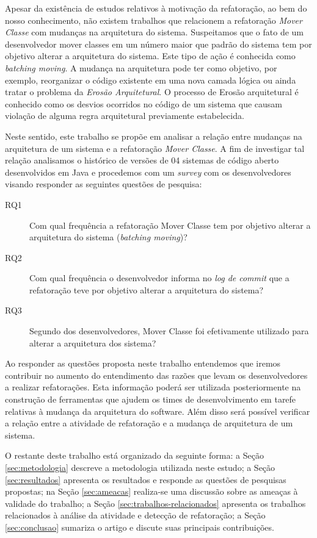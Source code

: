 \documentclass[12pt]{article}
\begin{document}
Apesar da existência de estudos relativos à motivação da refatoração, ao bem do nosso conhecimento, não existem trabalhos que relacionem a refatoração \textit{Mover Classe} com mudanças na arquitetura do sistema. Suspeitamos que o fato de um desenvolvedor mover classes em um número maior que padrão do sistema tem por objetivo alterar a arquitetura do sistema. Este tipo de ação é conhecida como \textit{batching moving}. A mudança na arquitetura pode ter como objetivo, por exemplo, reorganizar o código existente em uma nova camada lógica ou ainda tratar o problema da  \textit{Erosão Arquitetural}. O processo de Erosão arquitetural é conhecido como os desvios ocorridos no código de um sistema que causam violação de alguma regra arquitetural previamente estabelecida\cite{Perry:1992:FSS:141874.141884}.

Neste sentido, este trabalho se propõe em analisar a relação entre mudanças na arquitetura de um sistema e a refatoração \textit{Mover Classe}. A fim de investigar tal relação analisamos o histórico de versões de 04 sistemas de código aberto  desenvolvidos em Java e procedemos com um \textit{survey} com os desenvolvedores visando responder as seguintes questões de pesquisa:

\begin{description}
	\item[RQ1] Com qual frequência a refatoração Mover Classe tem por objetivo alterar a arquitetura do sistema (\textit{batching moving})?
	\item[RQ2] Com qual frequência o desenvolvedor informa no \textit{log de commit} que a refatoração teve por objetivo alterar a arquitetura do sistema?
	\item[RQ3] Segundo dos desenvolvedores, Mover Classe foi efetivamente utilizado para alterar a arquitetura dos sistema?	
\end{description}

Ao responder as questões proposta neste trabalho entendemos que iremos contribuir no aumento do entendimento das razões que levam os desenvolvedores a realizar refatorações. Esta informação poderá ser utilizada posteriormente na construção de ferramentas que ajudem os times de desenvolvimento em tarefe relativas à mudança da arquitetura do software. Além disso será possível verificar a relação entre a atividade de refatoração e a mudança de arquitetura de um sistema. 

O restante deste trabalho está organizado da seguinte forma: a Seção \ref{sec:metodologia} descreve a metodologia utilizada neste estudo; a Seção \ref{sec:resultados} apresenta os resultados e responde as questões de pesquisas propostas; na Seção \ref{sec:ameacas} realiza-se uma discussão sobre as ameaças à validade do trabalho; a Seção \ref{sec:trabalhos-relacionados} apresenta os trabalhos relacionados à análise da atividade e detecção de refatoração; a Seção \ref{sec:conclusao} sumariza o artigo e discute suas principais contribuições.
\end{document}
